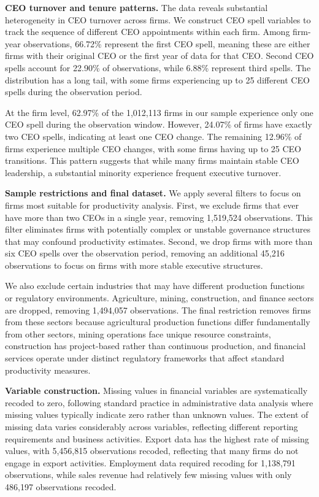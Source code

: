 \documentclass[11pt,a4paper]{article}
\begin{document}
\textbf{CEO turnover and tenure patterns.} The data reveals substantial heterogeneity in CEO turnover across firms. We construct CEO spell variables to track the sequence of different CEO appointments within each firm. Among firm-year observations, 66.72\% represent the first CEO spell, meaning these are either firms with their original CEO or the first year of data for that CEO. Second CEO spells account for 22.90\% of observations, while 6.88\% represent third spells. The distribution has a long tail, with some firms experiencing up to 25 different CEO spells during the observation period.

At the firm level, 62.97\% of the 1,012,113 firms in our sample experience only one CEO spell during the observation window. However, 24.07\% of firms have exactly two CEO spells, indicating at least one CEO change. The remaining 12.96\% of firms experience multiple CEO changes, with some firms having up to 25 CEO transitions. This pattern suggests that while many firms maintain stable CEO leadership, a substantial minority experience frequent executive turnover.

\textbf{Sample restrictions and final dataset.} We apply several filters to focus on firms most suitable for productivity analysis. First, we exclude firms that ever have more than two CEOs in a single year, removing 1,519,524 observations. This filter eliminates firms with potentially complex or unstable governance structures that may confound productivity estimates. Second, we drop firms with more than six CEO spells over the observation period, removing an additional 45,216 observations to focus on firms with more stable executive structures.

We also exclude certain industries that may have different production functions or regulatory environments. Agriculture, mining, construction, and finance sectors are dropped, removing 1,494,057 observations. The final restriction removes firms from these sectors because agricultural production functions differ fundamentally from other sectors, mining operations face unique resource constraints, construction has project-based rather than continuous production, and financial services operate under distinct regulatory frameworks that affect standard productivity measures.

\textbf{Variable construction.} Missing values in financial variables are systematically recoded to zero, following standard practice in administrative data analysis where missing values typically indicate zero rather than unknown values. The extent of missing data varies considerably across variables, reflecting different reporting requirements and business activities. Export data has the highest rate of missing values, with 5,456,815 observations recoded, reflecting that many firms do not engage in export activities. Employment data required recoding for 1,138,791 observations, while sales revenue had relatively few missing values with only 486,197 observations recoded.
\end{document}
